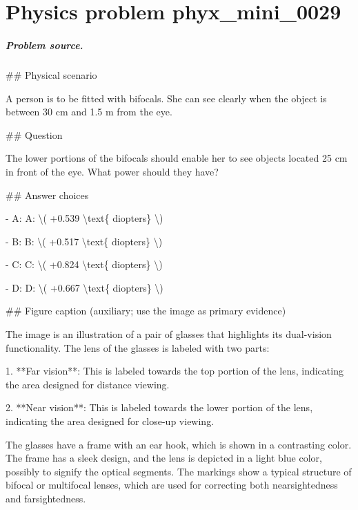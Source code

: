 
\chapter{Physics problem phyx\_mini\_0029}
\label{ch:PhyXMiniProblems_problem_phyx_mini_0029}

\paragraph{Problem source.}
\#\# Physical scenario

A person is to be fitted with bifocals. She can see clearly when the object is between 30 cm and 1.5 m from the eye.

\#\# Question

The lower portions of the bifocals should enable her to see objects located 25 cm in front of the eye. What power should they have?

\#\# Answer choices

- A: A: \textbackslash{}( +0.539 \textbackslash{}text\{ diopters\} \textbackslash{})

- B: B: \textbackslash{}( +0.517 \textbackslash{}text\{ diopters\} \textbackslash{})

- C: C: \textbackslash{}( +0.824 \textbackslash{}text\{ diopters\} \textbackslash{})

- D: D: \textbackslash{}( +0.667 \textbackslash{}text\{ diopters\} \textbackslash{})

\#\# Figure caption (auxiliary; use the image as primary evidence)

The image is an illustration of a pair of glasses that highlights its dual-vision functionality. The lens of the glasses is labeled with two parts:

1. **Far vision**: This is labeled towards the top portion of the lens, indicating the area designed for distance viewing.

2. **Near vision**: This is labeled towards the lower portion of the lens, indicating the area designed for close-up viewing.

The glasses have a frame with an ear hook, which is shown in a contrasting color. The frame has a sleek design, and the lens is depicted in a light blue color, possibly to signify the optical segments. The markings show a typical structure of bifocal or multifocal lenses, which are used for correcting both nearsightedness and farsightedness.

